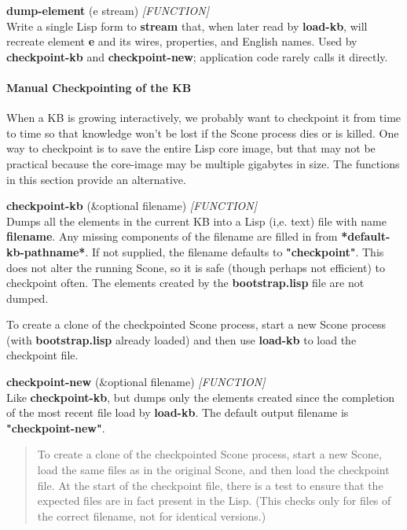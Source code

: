 \documentclass[titlepage,twoside,openright,11pt]{article}
\begin{document}
\textbf{dump-element} (e stream) \emph{{[}FUNCTION{]}}\\
Write a single Lisp form to \textbf{stream} that, when later read by
\textbf{load-kb}, will recreate element \textbf{e} and its wires,
properties, and English names. Used by \textbf{checkpoint-kb} and
\textbf{checkpoint-new}; application code rarely calls it directly.

\paragraph{Manual Checkpointing of the
KB}\label{manual-checkpointing-of-the-kb}

When a KB is growing interactively, we probably want to checkpoint it
from time to time so that knowledge won't be lost if the Scone process
dies or is killed. One way to checkpoint is to save the entire Lisp core
image, but that may not be practical because the core-image may be
multiple gigabytes in size. The functions in this section provide an
alternative.

\textbf{checkpoint-kb} (\&optional filename) \emph{{[}FUNCTION{]}\\
}Dumps all the elements in the current KB into a Lisp (i,e. text) file
with name \textbf{filename}. Any missing components of the filename are
filled in from \textbf{*default-kb-pathname*}. If not supplied, the
filename defaults to \textbf{"checkpoint"}. This does not alter the
running Scone, so it is safe (though perhaps not efficient) to
checkpoint often. The elements created by the \textbf{bootstrap.lisp}
file are not dumped.

To create a clone of the checkpointed Scone process, start a new Scone
process (with \textbf{bootstrap.lisp} already loaded) and then use
\textbf{load-kb} to load the checkpoint file.

\textbf{checkpoint-new} (\&optional filename) \emph{{[}FUNCTION{]}}\\
Like \textbf{checkpoint-kb}, but dumps only the elements created since
the completion of the most recent file load by \textbf{load-kb}. The
default output filename is \textbf{"checkpoint-new"}.

\begin{quote}
To create a clone of the checkpointed Scone process, start a new Scone,
load the same files as in the original Scone, and then load the
checkpoint file. At the start of the checkpoint file, there is a test to
ensure that the expected files are in fact present in the Lisp. (This
checks only for files of the correct filename, not for identical
versions.)
\end{quote}
\end{document}
